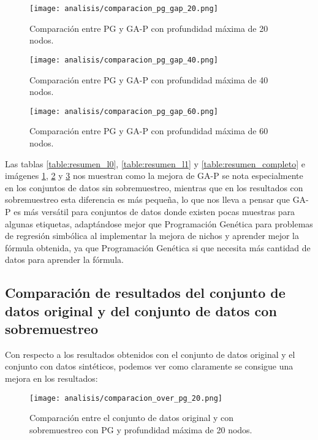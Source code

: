 \begin{figure}[H]
    \centering
	  \texttt{[image: analisis/comparacion\_pg\_gap\_20.png]}
	  \caption{Comparación entre PG y GA-P con profundidad máxima de 20 nodos.}\label{fig:cmp_pg_gap_20}

\end{figure}

\begin{figure}[H]
    \centering
	  \texttt{[image: analisis/comparacion\_pg\_gap\_40.png]}
	  \caption{Comparación entre PG y GA-P con profundidad máxima de 40 nodos.}\label{fig:cmp_pg_gap_40}

\end{figure}

\begin{figure}[H]
    \centering
	  \texttt{[image: analisis/comparacion\_pg\_gap\_60.png]}
	  \caption{Comparación entre PG y GA-P con profundidad máxima de 60 nodos.}\label{fig:cmp_pg_gap_60}
\end{figure}



Las tablas \ref{table:resumen_l0}, \ref{table:resumen_l1} y \ref{table:resumen_completo} e imágenes \ref{fig:cmp_pg_gap_20}, \ref{fig:cmp_pg_gap_40} y \ref{fig:cmp_pg_gap_60} nos muestran como la mejora de GA-P se nota especialmente en los conjuntos de datos sin sobremuestreo, mientras que en los resultados con sobremuestreo esta diferencia es más pequeña, lo que nos lleva a pensar que GA-P es más versátil para conjuntos de datos donde existen pocas muestras para algunas etiquetas, adaptándose mejor que Programación Genética para problemas de regresión simbólica al implementar la mejora de nichos y aprender mejor la fórmula obtenida, ya que Programación Genética si que necesita más cantidad de datos para aprender la fórmula.

\subsection{Comparación de resultados del conjunto de datos original y del conjunto de datos con sobremuestreo}

Con respecto a los resultados obtenidos con el conjunto de datos original y el conjunto con datos sintéticos, podemos ver como claramente se consigue una mejora en los resultados:

\begin{figure}[H]
    \centering
	  \texttt{[image: analisis/comparacion\_over\_pg\_20.png]}
	  \caption{Comparación entre el conjunto de datos original y con sobremuestreo con PG y profundidad máxima de 20 nodos.}\label{fig:cmp_pg_over_20}

\end{figure}

